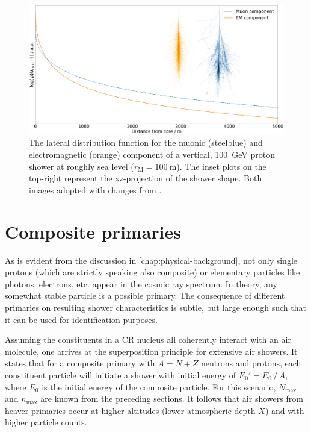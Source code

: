 
\begin{figure}
	\centering
	\includegraphics[width=1.0\textwidth]{./plots/componentwise_LDF.png}
	\caption{The lateral distribution function for the muonic (steelblue) and electromagnetic (orange) component of a vertical, \SI{100}{\giga\electronvolt}
	proton shower at roughly sea level ($r_\text{M}=\SI{100}{\meter}$). The inset plots on the top-right represent the xz-projection of the shower shape. Both 
	images adopted with changes from \cite{CorsikaShower}.}
	\label{fig:component-LDF}
\end{figure}

\section{Composite primaries}
\label{sec:superposition-principle}

As is evident from the discussion in \autoref{chap:physical-background}, not only single protons (which are strictly speaking also composite) or elementary 
particles like photons, electrons, etc. appear in the cosmic ray spectrum. In theory, any somewhat stable particle is a possible primary. The consequence of 
different primaries on resulting shower characteristics is subtle, but large enough such that it can be used for identification purposes.

Assuming the constituents in a CR nucleus all coherently interact with an air molecule, one arrives at the superposition principle for extensive air showers. It 
states that for a composite primary with $A = N + Z$ neutrons and protons, each constituent particle will initiate a shower with initial energy of 
$E_0' = E_0\,/\,A$, where $E_0$ is the initial energy of the composite particle. For this scenario, $N_\text{max}$ and $n_\text{max}$ are known from the preceding
sections. It follows that air showers from heaver primaries occur at higher altitudes (lower atmospheric depth $X$) and with higher particle counts.

